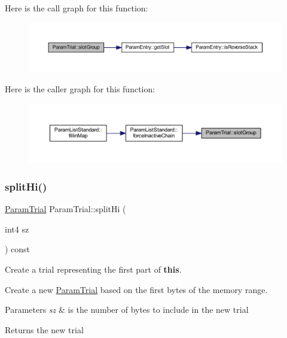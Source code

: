 Here is the call graph for this function\+:
\nopagebreak
\begin{figure}[H]
\begin{center}
\leavevmode
\includegraphics[width=350pt]{class_param_trial_a827f24578c88cbcd001d49ac820c12c2_cgraph}
\end{center}
\end{figure}
Here is the caller graph for this function\+:
\nopagebreak
\begin{figure}[H]
\begin{center}
\leavevmode
\includegraphics[width=350pt]{class_param_trial_a827f24578c88cbcd001d49ac820c12c2_icgraph}
\end{center}
\end{figure}
\mbox{\label{class_param_trial_a59648aa757130b4607ec1c18926ff234}} 
\subsubsection{\texorpdfstring{splitHi()}{splitHi()}}
{\footnotesize\ttfamily \mbox{\hyperlink{class_param_trial}{Param\+Trial}} Param\+Trial\+::split\+Hi (\begin{DoxyParamCaption}\item[{int4}]{sz }\end{DoxyParamCaption}) const}



Create a trial representing the first part of {\bfseries{this}}. 

Create a new \mbox{\hyperlink{class_param_trial}{Param\+Trial}} based on the first bytes of the memory range. 
\begin{DoxyParams}{Parameters}
{\em sz} & is the number of bytes to include in the new trial \\
\hline
\end{DoxyParams}
\begin{DoxyReturn}{Returns}
the new trial 
\end{DoxyReturn}


